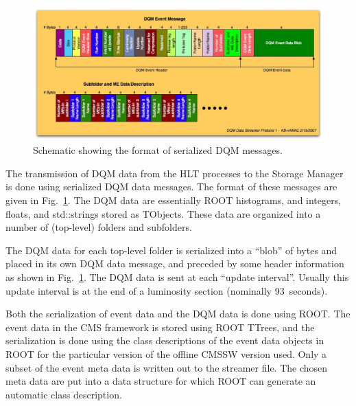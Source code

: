 \begin{figure}[hbtp]
  \begin{center}
    \includegraphics[width=6.0in]{Software/sm_dqmmess_structure.eps}
    \caption{Schematic showing the format of serialized DQM messages.}
    \label{fig:sm_dqmmess_structure.eps}
  \end{center}
\end{figure}

The transmission of DQM data from the HLT processes to the Storage Manager is done
using serialized DQM data messages. The format of these messages are given in
Fig.~\ref{fig:sm_dqmmess_structure.eps}. The DQM data are essentially ROOT
histograms, and integers, floats, and std::strings stored as TObjects. These
data are organized into a number of (top-level) folders and subfolders. 

The DQM data for each top-level folder is serialized into a ``blob'' of bytes and
placed in its own DQM data message, and preceded by some header information as
shown in Fig.~\ref{fig:sm_dqmmess_structure.eps}. The DQM data is sent at each
``update interval''. Usually this update interval is at the end of a luminosity
section (nominally 93~seconds).

Both the serialization of event data and the DQM data is done using ROOT.
The event data in the CMS framework is stored using ROOT TTrees, and
the serialization is done using the class descriptions of the event data
objects in ROOT for the particular version of the offline CMSSW version used. 
Only a subset of the event meta data is written out to the streamer file. 
The chosen meta data are put into a data structure for which ROOT can generate
an automatic class description.

